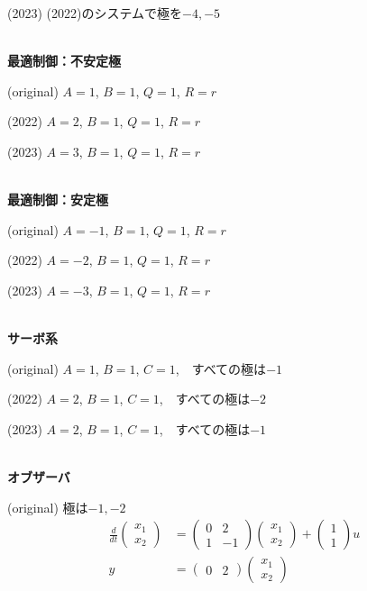 \documentclass[a4paper,11pt,fleqn]{jreport}
\begin{document}
(2023) (2022)のシステムで極を{\color{red}$-4,-5$}



\ \\ \noindent
{\bf 最適制御：不安定極}

(original)
$A=1$, $B=1$, $Q=1$, $R=r$

(2022)
{\color{red}$A=2$}, $B=1$, $Q=1$, $R=r$

(2023)
{\color{red}$A=3$}, $B=1$, $Q=1$, $R=r$

\ \\ \noindent
{\bf 最適制御：安定極}

(original)
$A=-1$, $B=1$, $Q=1$, $R=r$

(2022)
{\color{red}$A=-2$}, $B=1$, $Q=1$, $R=r$

(2023)
{\color{red}$A=-3$}, $B=1$, $Q=1$, $R=r$

\ \\ \noindent
{\bf サーボ系}

(original)
$A=1$, $B=1$, $C=1$,　すべての極は$-1$

(2022)
{\color{red}$A=2$}, $B=1$, $C=1$,　すべての極は{\color{red}$-2$}

(2023)
{\color{red}$A=2$}, $B=1$, $C=1$,　すべての極は{\color{red}$-1$}

\ \\ \noindent
{\bf オブザーバ}

(original) 極は$-1, -2$
\begin{align*}
	\frac{d}{dt}
	\left (
	\begin{array}{c}
	 x_1 \\ x_2 
	\end{array}
	\right )
	& = 
	\left (
	\begin{array}{cc}
	 0 & 2 \\
	 1 & -1
	\end{array}
	\right )
	\left (
	\begin{array}{c}
	 x_1 \\ x_2 
	\end{array}
	\right )
	+
	\left (
	\begin{array}{c}
	 1 \\ 1 
	\end{array}
	\right )
	u
\\
	y&=
	\left ( \begin{array}{cc}
		0 & 2 
	\end{array} \right )
	\left (	\begin{array}{c}
		x_1 \\ x_2 
	\end{array} \right )
\end{align*}
\end{document}
